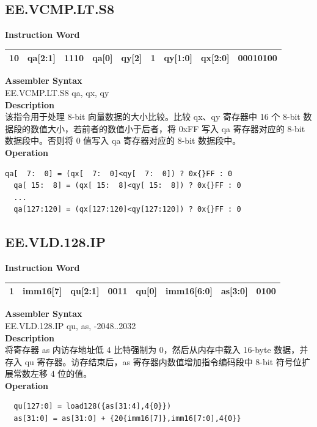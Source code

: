 \clearpage
\subsection{EE.VCMP.LT.S8}\label{instruction:EEVCMPLTS8}
\setlength\tabcolsep{6pt}
\textbf{Instruction Word} \\
\begin{tabular}{|c|c|c|c|c|c|c|c|c|}
	\hline
	10 & qa[2:1] & 1110 & qa[0] & qy[2] & 1 & qy[1:0] & qx[2:0] & 00010100 \\
	\hline
\end{tabular}

\textbf{Assembler Syntax} \\
EE.VCMP.LT.S8 qa, qx, qy \\
\textbf{Description} \\
该指令用于处理 8-bit 向量数据的大小比较。比较 qx、qy 寄存器中 16 个 8-bit 数据段的数值大小，若前者的数值小于后者，将 0x{}FF 写入 qa 寄存器对应的 8-bit 数据段中。否则将 0 值写入 qa 寄存器对应的 8-bit 数据段中。\\
\textbf{Operation}
\begin{lstlisting}[escapeinside=`?]
  qa[  7:  0] = (qx[  7:  0]<qy[  7:  0]) ? 0x{}FF : 0
  qa[ 15:  8] = (qx[ 15:  8]<qy[ 15:  8]) ? 0x{}FF : 0
  ...
  qa[127:120] = (qx[127:120]<qy[127:120]) ? 0x{}FF : 0
\end{lstlisting}

\clearpage
\subsection{EE.VLD.128.IP}\label{instruction:EEVLD128IP}
\setlength\tabcolsep{6pt}
\textbf{Instruction Word} \\
\begin{tabular}{|c|c|c|c|c|c|c|c|}
	\hline
	1 & imm16[7] & qu[2:1] & 0011 & qu[0] & imm16[6:0] & as[3:0] & 0100 \\
	\hline
\end{tabular}

\textbf{Assembler Syntax} \\
EE.VLD.128.IP qu, as, -2048..2032 \\
\textbf{Description} \\
将寄存器 as 内访存地址低 4 比特强制为 0，然后从内存中载入 16-byte 数据，并存入 qu 寄存器。访存结束后，as 寄存器内数值增加指令编码段中 8-bit 符号位扩展常数左移 4 位的值。\\
\textbf{Operation}
\begin{lstlisting}
  qu[127:0] = load128({as[31:4],4{0}})
  as[31:0] = as[31:0] + {20{imm16[7]},imm16[7:0],4{0}}
\end{lstlisting}

